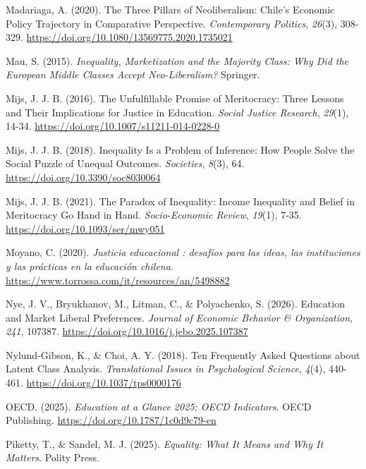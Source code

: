 \documentclass[
  spanish,
  a4paper,
  oneside]{scrbook}
\newlength{\cslhangindent}
\newenvironment{CSLReferences}[2] %
 {\begin{list}{}{%
  \setlength{\itemindent}{0pt}
  \setlength{\leftmargin}{0pt}
  \setlength{\parsep}{0pt}
  \ifodd #1
   \setlength{\leftmargin}{\cslhangindent}
   \setlength{\itemindent}{-1\cslhangindent}
  \fi
  \setlength{\itemsep}{#2\baselineskip}}}
 {\end{list}}
\begin{document}
\begin{CSLReferences}{1}{0}
Madariaga, A. (2020). The Three Pillars of Neoliberalism: Chile's
Economic Policy Trajectory in Comparative Perspective.
\emph{Contemporary Politics}, \emph{26}(3), 308-329.
\url{https://doi.org/10.1080/13569775.2020.1735021}

Mau, S. (2015). \emph{Inequality, Marketization and the Majority Class:
Why Did the European Middle Classes Accept Neo-Liberalism?} Springer.

Mijs, J. J. B. (2016). The Unfulfillable Promise of Meritocracy: Three
Lessons and Their Implications for Justice in Education. \emph{Social
Justice Research}, \emph{29}(1), 14-34.
\url{https://doi.org/10.1007/s11211-014-0228-0}

Mijs, J. J. B. (2018). Inequality Is a Problem of Inference: How People
Solve the Social Puzzle of Unequal Outcomes. \emph{Societies},
\emph{8}(3), 64. \url{https://doi.org/10.3390/soc8030064}

Mijs, J. J. B. (2021). The Paradox of Inequality: Income Inequality and
Belief in Meritocracy Go Hand in Hand. \emph{Socio-Economic Review},
\emph{19}(1), 7-35. \url{https://doi.org/10.1093/ser/mwy051}

Moyano, C. (2020). \emph{Justicia educacional : desafíos para las ideas,
las instituciones y las prácticas en la educación chilena.}
\url{https://www.torrossa.com/it/resources/an/5498882}

Nye, J. V., Bryukhanov, M., Litman, C., \& Polyachenko, S. (2026).
Education and Market Liberal Preferences. \emph{Journal of Economic
Behavior \& Organization}, \emph{241}, 107387.
\url{https://doi.org/10.1016/j.jebo.2025.107387}

Nylund-Gibson, K., \& Choi, A. Y. (2018). Ten Frequently Asked Questions
about Latent Class Analysis. \emph{Translational Issues in Psychological
Science}, \emph{4}(4), 440-461. \url{https://doi.org/10.1037/tps0000176}

OECD. (2025). \emph{Education at a Glance 2025: OECD Indicators}. OECD
Publishing. \url{https://doi.org/10.1787/1c0d9c79-en}

Piketty, T., \& Sandel, M. J. (2025). \emph{Equality: What It Means and
Why It Matters}. Polity Press.


\end{CSLReferences}
\end{document}
